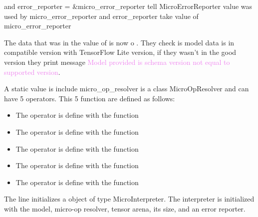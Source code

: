  and error\_reporter = \&micro\_error\_reporter  tell MicroErrorReporter value was used by micro\_error\_reporter and error\_reporter take value of micro\_error\_reporter 

\bigskip 

The data that was in the value of  is now o . They check is model data is in compatible version with TensorFlow Lite version, if they wasn't in the good version they print message \textcolor{violet}{Model provided is schema version not equal to supported version}.  

\begin{center}
    \label{Magic Wand function}
\end{center}

A static value is include micro\_op\_resolver is a class MicroOpResolver  and can have 5 operators. This 5 function are defined as follows: 

\begin{itemize}
    \item The operator   is define with the function 
    \item  The operator   is define with the function 
    \item The operator   is define with the function 
    \item The operator   is define with the function 
    \item The operator   is define with the function 
\end{itemize} 

\begin{center}
    \label{Magic Wand function}
\end{center}

The line initializes a object   of type MicroInterpreter. The interpreter is initialized with the model, micro-op resolver, tensor arena, its size, and an error reporter.

